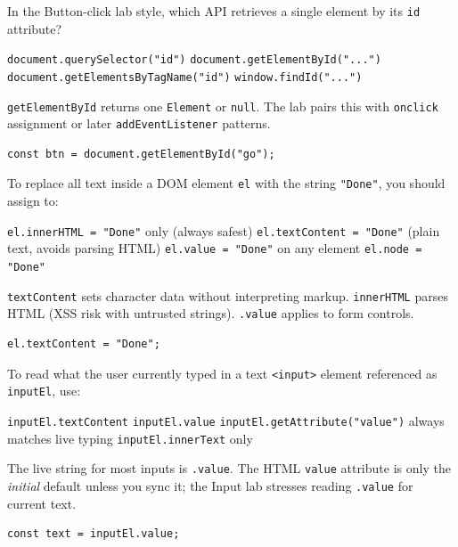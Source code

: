 \question[4]
In the Button-click lab style, which API retrieves a single element by its \texttt{id} attribute?
\begin{choices}
  \choice \texttt{document.querySelector("id")}
  \CorrectChoice \texttt{document.getElementById("...")}
  \choice \texttt{document.getElementsByTagName("id")}
  \choice \texttt{window.findId("...")}
\end{choices}
\begin{solution}
  \texttt{getElementById} returns one \texttt{Element} or \texttt{null}. The lab pairs this with \texttt{onclick} assignment or later \texttt{addEventListener} patterns.
\begin{lstlisting}[style=js]
const btn = document.getElementById("go");
\end{lstlisting}
\end{solution}

\question[4]
To replace all text inside a DOM element \texttt{el} with the string \texttt{"Done"}, you should assign to:
\begin{choices}
  \choice \texttt{el.innerHTML = "Done"} only (always safest)
  \CorrectChoice \texttt{el.textContent = "Done"} (plain text, avoids parsing HTML)
  \choice \texttt{el.value = "Done"} on any element
  \choice \texttt{el.node = "Done"}
\end{choices}
\begin{solution}
  \texttt{textContent} sets character data without interpreting markup. \texttt{innerHTML} parses HTML (XSS risk with untrusted strings). \texttt{.value} applies to form controls.
\begin{lstlisting}[style=js]
el.textContent = "Done";
\end{lstlisting}
\end{solution}

\question[4]
To read what the user currently typed in a text \texttt{<input>} element referenced as \texttt{inputEl}, use:
\begin{choices}
  \choice \texttt{inputEl.textContent}
  \CorrectChoice \texttt{inputEl.value}
  \choice \texttt{inputEl.getAttribute("value")} always matches live typing
  \choice \texttt{inputEl.innerText} only
\end{choices}
\begin{solution}
  The live string for most inputs is \texttt{.value}. The HTML \texttt{value} attribute is only the \emph{initial} default unless you sync it; the Input lab stresses reading \texttt{.value} for current text.
\begin{lstlisting}[style=js]
const text = inputEl.value;
\end{lstlisting}
\end{solution}

